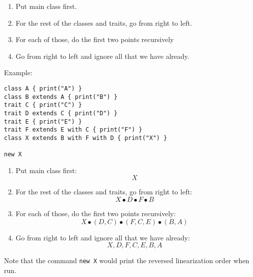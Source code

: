 \begin{mytitle}\hfill
\begin{enumerate}
    \item Put main class first.
    \item For the rest of the classes and traits, go from right to left.
    \item For each of those, do the first two points recursively
    \item Go from right to left and ignore all that we have already.
\end{enumerate}
Example: 
\lstset{language=Scala}
\begin{lstlisting}
class A { print("A") }
class B extends A { print("B") }
trait C { print("C") }
trait D extends C { print("D") }
trait E { print("E") }
trait F extends E with C { print("F") }
class X extends B with F with D { print("X") }

new X
\end{lstlisting}
\begin{enumerate}
    \item Put main class first: 
        $$X$$
    \item For the rest of the classes and traits, go from right to left: 
        $$X \bullet D \bullet F \bullet B$$
    \item For each of those, do the first two points recursively:
        $$X \bullet (D,C) \bullet (F, C, E) \bullet (B, A)$$
    \item Go from right to left and ignore all that we have already: 
        $$X, D, F, C, E, B, A$$
\end{enumerate}
Note that the command \texttt{new X} would print the reversed linearization order when run.
\end{mytitle}
